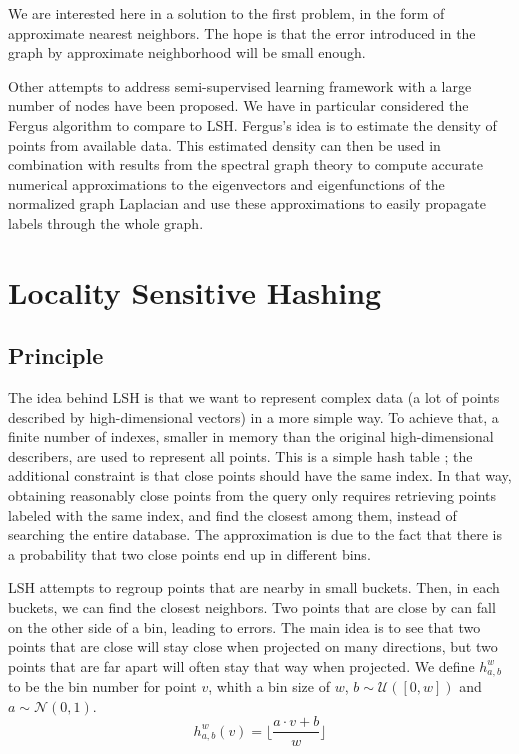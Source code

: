 \documentclass{article} %
\begin{document}
We are interested here in a solution to the first problem, in the form of approximate nearest neighbors. The hope is that the error introduced in the graph by approximate neighborhood will be small enough.

Other attempts to address semi-supervised learning framework with a large number of nodes have been proposed. We have in particular considered the Fergus algorithm \cite{fergus2009semi} to compare to LSH. Fergus's idea is to estimate the density of points from available data. This estimated density can then be used in combination with results from the spectral graph theory to compute accurate numerical approximations to the eigenvectors and eigenfunctions of the normalized graph Laplacian and use these approximations to easily propagate labels through the whole graph.


\section{Locality Sensitive Hashing}
\subsection{Principle}

The idea behind LSH is that we want to represent complex data (a lot of points described by high-dimensional vectors) in a more simple way. To achieve that, a finite number of indexes, smaller in memory than the original high-dimensional describers, are used to represent all points. This is a simple hash table ; the additional constraint is that close points should have the same index. In that way, obtaining reasonably close points from the query only requires retrieving points labeled with the same index, and find the closest among them, instead of searching the entire database. The approximation is due to the fact that there is a probability that two close points end up in different bins.

LSH attempts to regroup points that are nearby in small buckets. Then, in each buckets, we can find the closest neighbors. Two points that are close by can fall on the other side of a bin, leading to errors. The main idea is to see that two points that are close will stay close when projected on many directions, but two points that are far apart will often stay that way when projected. We define $h^w_{a,b}$ to be the bin number for point $v$, whith a bin size of $w$, $b \sim \mathcal{U}([0,w])$ and $a \sim \mathcal{N}(0,1)$.
$$h_{a,b}^w(v) = \lfloor \frac{ a \cdot v + b}{w} \rfloor$$
\end{document}
